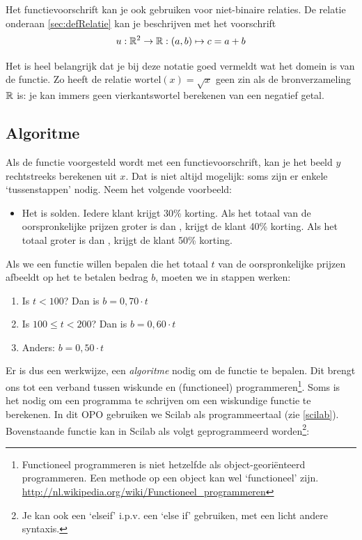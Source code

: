 Het functievoorschrift kan je ook gebruiken voor niet-binaire relaties. De relatie onderaan \cref{sec:defRelatie} kan je beschrijven met het voorschrift
\[
u:\mathbb{R}^2\to\mathbb{R}:(a,b)\mapsto c =a+b
\]

Het is heel belangrijk dat je bij deze notatie goed vermeldt wat het domein is van de functie. Zo heeft de relatie $\text{wortel}(x)=\sqrt{x}$ geen zin als de bronverzameling $\mathbb{R}$ is: je kan immers geen vierkantswortel berekenen van een negatief getal.

\subsection{Algoritme}
Als de functie voorgesteld wordt met een functievoorschrift, kan je het beeld  $y$ rechtstreeks berekenen uit $x$. Dat is niet altijd mogelijk: soms zijn er enkele `tussenstappen' nodig. Neem het volgende voorbeeld:
\begin{itemize}
\item Het is solden. Iedere klant krijgt 30\% korting. Als het totaal van de oorspronkelijke prijzen groter is dan , krijgt de klant 40\% korting. Als het totaal groter is dan , krijgt de klant 50\% korting. 
\end{itemize}
Als we een functie willen bepalen die het totaal $t$ van de oorspronkelijke prijzen afbeeldt op het te betalen bedrag $b$, moeten we in stappen werken:
\begin{enumerate}
\item Is $t<100$? Dan is $b=0,70\cdot t$
\item Is $100\leqslant t<200$? Dan is $b=0,60\cdot t$
\item Anders: $b=0,50\cdot t$
\end{enumerate}

Er is dus een werkwijze, een \emph{algoritme} nodig om de functie te bepalen. Dit brengt ons tot een verband tussen wiskunde en (functioneel) programmeren\footnote{Functioneel programmeren is niet hetzelfde als object-geori\"enteerd programmeren. Een methode op een object kan wel `functioneel' zijn. \url{http://nl.wikipedia.org/wiki/Functioneel_programmeren}}. Soms is het nodig om een programma te schrijven om een wiskundige functie te berekenen. In dit OPO gebruiken we Scilab als programmeertaal (zie \cref{scilab}). Bovenstaande functie kan in Scilab als volgt geprogrammeerd worden\footnote{Je kan ook een ‘elseif’ i.p.v. een ‘else if’ gebruiken, met een licht andere syntaxis.}:


